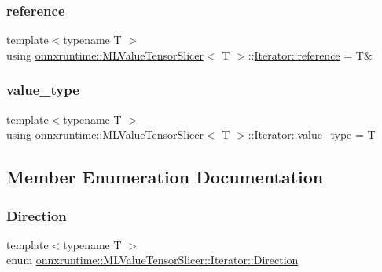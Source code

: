 \subsubsection{\texorpdfstring{reference}{reference}}
{\footnotesize\ttfamily template$<$typename T $>$ \\
using \mbox{\hyperlink{classonnxruntime_1_1MLValueTensorSlicer}{onnxruntime\+::\+M\+L\+Value\+Tensor\+Slicer}}$<$ T $>$\+::\mbox{\hyperlink{classonnxruntime_1_1MLValueTensorSlicer_1_1Iterator_a528f0b8364b23168f0565c1503b44cd0}{Iterator\+::reference}} =  T\&}

\mbox{\label{classonnxruntime_1_1MLValueTensorSlicer_1_1Iterator_ad17283e0490333d5f34e50ba7c83c279}} 
\subsubsection{\texorpdfstring{value\+\_\+type}{value\_type}}
{\footnotesize\ttfamily template$<$typename T $>$ \\
using \mbox{\hyperlink{classonnxruntime_1_1MLValueTensorSlicer}{onnxruntime\+::\+M\+L\+Value\+Tensor\+Slicer}}$<$ T $>$\+::\mbox{\hyperlink{classonnxruntime_1_1MLValueTensorSlicer_1_1Iterator_ad17283e0490333d5f34e50ba7c83c279}{Iterator\+::value\+\_\+type}} =  T}



\subsection{Member Enumeration Documentation}
\mbox{\label{classonnxruntime_1_1MLValueTensorSlicer_1_1Iterator_ad83ea2768d16fdaead62f58e6190a0c1}} 
\subsubsection{\texorpdfstring{Direction}{Direction}}
{\footnotesize\ttfamily template$<$typename T $>$ \\
enum \mbox{\hyperlink{classonnxruntime_1_1MLValueTensorSlicer_1_1Iterator_ad83ea2768d16fdaead62f58e6190a0c1}{onnxruntime\+::\+M\+L\+Value\+Tensor\+Slicer\+::\+Iterator\+::\+Direction}}\hspace{0.3cm}{\ttfamily [strong]}}

